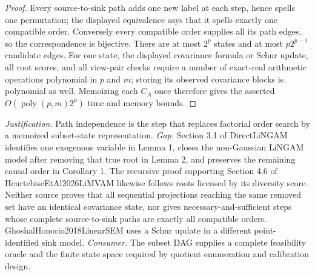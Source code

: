 \documentclass{article}
\begin{document}
\begin{proof}
Every source-to-sink path adds one new label at each step, hence spells one permutation; the displayed equivalence says that it spells exactly one compatible order.  Conversely every compatible order supplies all its path edges, so the correspondence is bijective.  There are at most \(2^p\) states and at most \(p2^{p-1}\) candidate edges.  For one state, the displayed covariance formula or Schur update, all root scores, and all view-pair checks require a number of exact-real arithmetic operations polynomial in \(p\) and \(m\); storing its observed covariance blocks is polynomial as well.  Memoizing each \(C_A\) once therefore gives the asserted \(O(\operatorname{poly}(p,m)2^p)\) time and memory bounds.
\end{proof}
\par\smallskip\noindent \textit{Justification.} Path independence is the step that replaces factorial order search by a memoized subset-state representation. \textit{Gap.} Section 3.1 of DirectLiNGAM identifies one exogenous variable in Lemma 1, closes the non-Gaussian LiNGAM model after removing that true root in Lemma 2, and preserves the remaining causal order in Corollary 1. The recursive proof supporting Section 4.6 of HeurtebiseEtAl2026LiMVAM likewise follows roots licensed by its diversity score. Neither source proves that all sequential projections reaching the same removed set have an identical covariance state, nor gives necessary-and-sufficient steps whose complete source-to-sink paths are exactly all compatible orders. GhoshalHonorio2018LinearSEM uses a Schur update in a different point-identified sink model. \textit{Consumer.} The subset DAG supplies a complete feasibility oracle and the finite state space required by quotient enumeration and calibration design.
\end{document}
